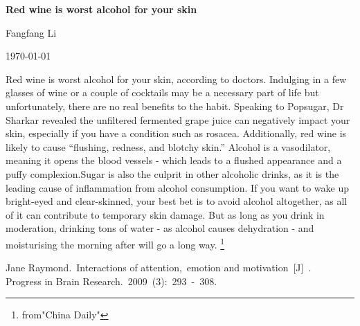 \documentclass{article}
\begin{document}
\begin{center}
{\bfseries \LARGE Red wine is worst alcohol for your skin}
\end{center}
\begin{center}
Fangfang Li
\end{center}
\begin{center}
\today
\end{center}
\par Red wine is worst alcohol for your skin, according to doctors. Indulging in a few glasses of wine or a couple of cocktails may be a necessary part of life but unfortunately, there are no real benefits to the habit. Speaking to Popsugar, Dr Sharkar revealed the unfiltered fermented grape juice can negatively impact your skin, especially if you have a condition such as rosacea. Additionally, red wine is likely to cause “flushing, redness, and blotchy skin.” Alcohol is a vasodilator, meaning it opens the blood vessels - which leads to a flushed appearance and a puffy complexion.Sugar is also the culprit in other alcoholic drinks, as it is the leading cause of inflammation from alcohol consumption. If you want to wake up bright-eyed and clear-skinned, your best bet is to avoid alcohol altogether, as all of it can contribute to temporary skin damage. But as long as you drink in moderation, drinking tons of water - as alcohol causes dehydration - and moisturising the morning after will go a long way.
\footnote{from"China Daily"}
\begin{thebibliography}{99}
Jane Raymond.~Interactions of attention,~emotion and motivation~[J]~.~ Progress in Brain Research.~2009~(3):~293~-~308.
\end{thebibliography}
\end{document}
